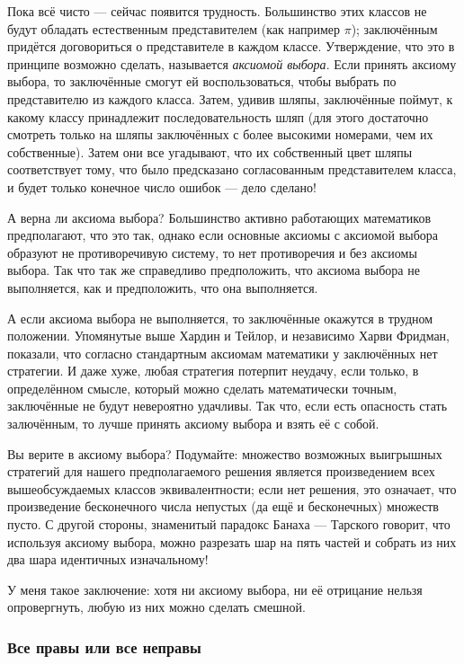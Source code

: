 Пока всё чисто --- сейчас появится трудность.
Большинство этих классов не будут обладать естественным представителем (как например $\pi$);
заключённым придётся договориться о представителе в каждом классе.
Утверждение, что это в принципе возможно сделать, называется \emph{аксиомой выбора}.
Если принять аксиому выбора, то заключённые смогут ей воспользоваться, чтобы выбрать по представителю из каждого класса.
Затем, удивив шляпы, заключённые поймут, к какому классу принадлежит последовательность шляп (для этого достаточно смотреть только на шляпы заключённых с более высокими номерами, чем их собственные).
Затем они все угадывают, что их собственный цвет шляпы соответствует тому, что было предсказано согласованным представителем класса, и будет только конечное число ошибок --- дело сделано!

А верна ли аксиома выбора?
Большинство активно работающих математиков предполагают, что это так, однако если основные аксиомы с аксиомой выбора образуют не противоречивую систему, то нет противоречия и без аксиомы выбора.
Так что так же справедливо предположить, что аксиома выбора не выполняется, как и предположить, что она выполняется.

А если аксиома выбора не выполняется, то заключённые окажутся в трудном положении.
Упомянутые выше Хардин и Тейлор, и независимо Харви Фридман, показали, что согласно стандартным аксиомам математики у заключённых нет стратегии.
И даже хуже, любая стратегия потерпит неудачу, если только, в определённом смысле, который можно сделать математически точным, заключённые не будут невероятно удачливы.
Так что, если есть опасность стать залючённым, то лучше принять аксиому выбора и взять её с собой.

Вы верите в аксиому выбора?
Подумайте: множество возможных выигрышных стратегий для нашего предполагаемого решения является произведением всех вышеобсуждаемых классов эквивалентности; если нет решения, это означает, что произведение бесконечного числа непустых (да ещё и бесконечных) множеств пусто.
С другой стороны, знаменитый парадокс Банаха --- Тарского говорит, что используя аксиому выбора, можно разрезать шар на пять частей и собрать из них два шара идентичных изначальному!

У меня такое заключение: хотя ни аксиому выбора, ни её отрицание нельзя опровергнуть, любую из них можно сделать смешной.


\subsubsection*{Все правы или все неправы}

